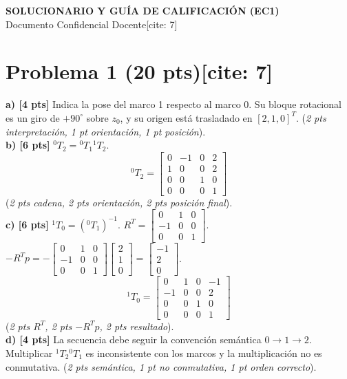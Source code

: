 \documentclass[11pt, a4paper]{article}
\begin{document}
\begin{center}
    \Large\textbf{\textcolor{red!80!black}{SOLUCIONARIO Y GUÍA DE CALIFICACIÓN (EC1)}}\\[0.2cm]
    \normalsize Documento Confidencial Docente[cite: 7]
\end{center}

\section*{Problema 1 (20 pts)[cite: 7]}
\textbf{a) [4 pts]} Indica la pose del marco 1 respecto al marco 0. Su bloque rotacional es un giro de $+90^\circ$ sobre $z_0$, y su origen está trasladado en $[2,1,0]^T$. (\textit{2 pts interpretación, 1 pt orientación, 1 pt posición}). \\
\textbf{b) [6 pts]} ${}^{0}T_2 = {}^{0}T_1 {}^{1}T_2$.
\begin{equation*}
    {}^{0}T_2 = \begin{bmatrix} 0 & -1 & 0 & 2 \\ 1 & 0 & 0 & 2 \\ 0 & 0 & 1 & 0 \\ 0 & 0 & 0 & 1 \end{bmatrix}
\end{equation*}
(\textit{2 pts cadena, 2 pts orientación, 2 pts posición final}). \\
\textbf{c) [6 pts]} ${}^{1}T_0 = ({}^{0}T_1)^{-1}$. $R^T = \begin{bmatrix} 0 & 1 & 0 \\ -1 & 0 & 0 \\ 0 & 0 & 1 \end{bmatrix}$. $-R^T p = -\begin{bmatrix} 0 & 1 & 0 \\ -1 & 0 & 0 \\ 0 & 0 & 1 \end{bmatrix}\begin{bmatrix} 2 \\ 1 \\ 0 \end{bmatrix} = \begin{bmatrix} -1 \\ 2 \\ 0 \end{bmatrix}$. 
\begin{equation*}
    {}^{1}T_0 = \begin{bmatrix} 0 & 1 & 0 & -1 \\ -1 & 0 & 0 & 2 \\ 0 & 0 & 1 & 0 \\ 0 & 0 & 0 & 1 \end{bmatrix}
\end{equation*}
(\textit{2 pts $R^T$, 2 pts $-R^Tp$, 2 pts resultado}). \\
\textbf{d) [4 pts]} La secuencia debe seguir la convención semántica $0 \to 1 \to 2$. Multiplicar ${}^1T_2{}^0T_1$ es inconsistente con los marcos y la multiplicación no es conmutativa. (\textit{2 pts semántica, 1 pt no conmutativa, 1 pt orden correcto}).
\end{document}

